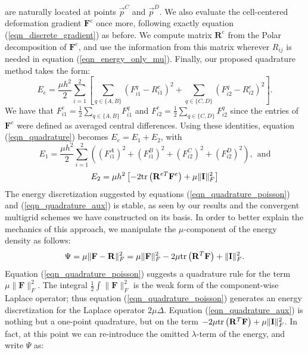 are naturally located at points $\vec{p}^C$ and $\vec{p}^D$. We also evaluate the cell-centered deformation gradient $\mathbf{F}^e$ once more, following exactly equation
(\ref{eqn_discrete_gradient}) as before. We compute matrix $\mathbf{R}^e$ from the Polar decomposition of $\mathbf{F}^e$, and use the information from this matrix wherever $R_{ij}$ is needed 
in equation (\ref{eqn_energy_only_mu}). Finally, our proposed quadrature method takes the form:
\begin{equation}
\!E_e=\frac{\mu h^2}{2}\sum_{i=1}^2\left[\sum_{q\in\{A,B\}}\!\!\!\!\left(F_{i1}^q\!-\!R_{i1}^e\right)^2+\!\!\!\!\sum_{q\in\{C,D\}}\!\!\!\!\left(F_{i2}^q\!-\!R_{i2}^e\right)^2\right].
\label{eqn_quadrature}
\end{equation}
We have that $F_{i1}^e\!=\!\frac{1}{2}\sum_{q\in\{A,B\}}F_{i1}^q$ and $F_{i2}^e\!=\!\frac{1}{2}\sum_{q\in\{C,D\}}F_{i2}^q$ since the entries of $\mathbf{F}^e$ were defined as averaged
central differences. Using these identities, equation (\ref{eqn_quadrature}) becomes $E_e=E_1+E_2$, with
\begin{equation}
E_1=\frac{\mu h^2}{2}\sum_{i=1}^2\left((F_{i1}^A)^2\!+\!(F_{i1}^B)^2\!+\!(F_{i2}^C)^2\!+\!(F_{i2}^D)^2\right),\ \ \mbox{and}
\label{eqn_quadrature_poisson}
\end{equation}
\begin{equation}
E_2=\mu h^2\left[-2\mbox{tr}\left(\mathbf{R}^{eT}\mathbf{F}^e\right)+\mu\|\mathbf{I}\|_F^2\right]
\label{eqn_quadrature_aux}
\end{equation}
The energy discretization suggested by equations (\ref{eqn_quadrature_poisson}) and (\ref{eqn_quadrature_aux}) is stable, as seen by our results and the convergent multigrid schemes
we have constructed on its basis. In order to better explain the
mechanics of this approach, we manipulate the $\mu$-component of the
energy density as follows:
$$
\Psi=\mu\|\mathbf{F}-\mathbf{R}\|_F^2=\mu\|\mathbf{F}\|_F^2-2\mu\mbox{tr}\left(\mathbf{R}^T\mathbf{F}\right)+\|\mathbf{I}\|_F^2.
$$
Equation (\ref{eqn_quadrature_poisson}) suggests a quadrature rule for the term $\mu\|\mathbf{F}\|_F^2$. The integral $\frac{1}{2}\int\|\mathbf{F}\|_F^2$ is the weak form of the
component-wise Laplace operator; thus equation (\ref{eqn_quadrature_poisson}) generates an energy discretization for the Laplace operator $2\mu\Delta$. Equation
(\ref{eqn_quadrature_aux}) is nothing but a one-point quadrature, but on the term $-2\mu\mbox{tr}\left(\mathbf{R}^T\mathbf{F}\right)+\mu\|\mathbf{I}\|_F^2$. In fact, at this point we can
re-introduce the omitted $\lambda$-term of the energy, and write $\Psi$ as:
